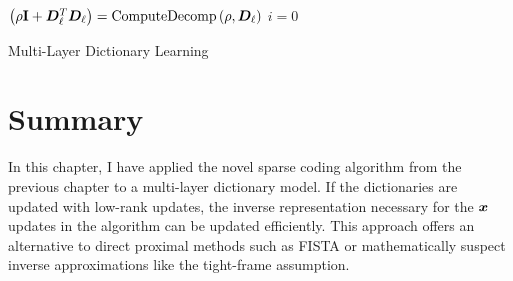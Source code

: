 \begin{algorithm}[h]
\SetAlgoLined
   \Input{Overrelaxation Parameter: $\alpha \in (0,2]$, Signal: $\vs$, Unnormalized initial dictionary for each layer: $\mD_{\ell}$, Objective function term coefficients for each layer: $\mu_{\ell}$ and $\lambda_{\ell}$}
   {
      $\left(\rho{\bf I} + \bm{D}_{\ell}^T\bm{D}_{\ell}\right) = \operatorname{ComputeDecomp}\left(\rho,\bm{D}_{\ell} \right)$
   }
   $i = 0$ \\
 \caption{Multi-Layer Dictionary Learning}\label{algorithm:Multi-Layer Dictionary Learning}
\end{algorithm}

\section{Summary}
In this chapter, I have applied the novel sparse coding algorithm from the previous chapter to a multi-layer dictionary model. If the dictionaries are updated with low-rank updates, the inverse representation necessary for the $\bm{x}$ updates in the algorithm can be updated efficiently. This approach offers an alternative to direct proximal methods such as FISTA or mathematically suspect inverse approximations like the tight-frame assumption.
